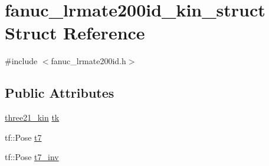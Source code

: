 \hypertarget{structfanuc__lrmate200id__kin__struct}{\section{fanuc\-\_\-lrmate200id\-\_\-kin\-\_\-struct Struct Reference}
\label{structfanuc__lrmate200id__kin__struct}
}


{\ttfamily \#include $<$fanuc\-\_\-lrmate200id.\-h$>$}

\subsection*{Public Attributes}
\begin{DoxyCompactItemize}
\item 
\hyperlink{structthree21__kin}{three21\-\_\-kin} \hyperlink{structfanuc__lrmate200id__kin__struct_a7e47a5d252d683e7c729ba1012f45529}{tk}
\item 
tf\-::\-Pose \hyperlink{structfanuc__lrmate200id__kin__struct_affe117521f4d20a734362bcbaf0f87e6}{t7}
\item 
tf\-::\-Pose \hyperlink{structfanuc__lrmate200id__kin__struct_a92903cf8037c18791e4c93d1eabaf07b}{t7\-\_\-inv}
\end{DoxyCompactItemize}


